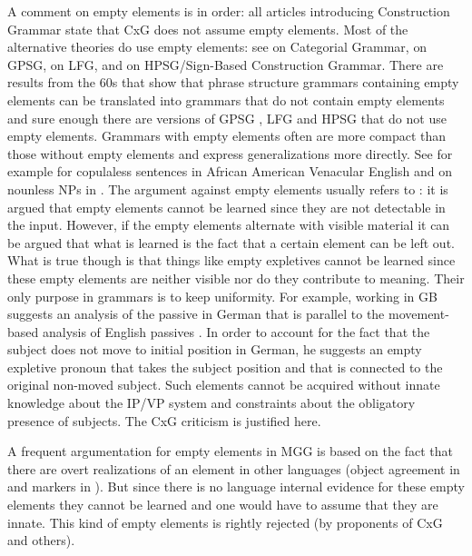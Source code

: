 \documentclass[output=paper]{langsci/langscibook}
\begin{document}
A comment on empty elements is in order: all articles introducing Construction Grammar state that
CxG does not assume empty elements. Most of the alternative theories do use empty elements: see
\citet{KoenigE99a-u} on Categorial Grammar, \citet*[]{GKPS85a} on GPSG, \citet[]{Bresnan2001a} on LFG,  and  on HPSG/Sign-Based
Construction Grammar. There are results from the 60s that show that phrase structure grammars
containing empty elements can be translated into grammars that do not contain empty elements
\citep*[, Lemma~4.1]{BHPS61a} and sure enough there are versions of GPSG \citep[--77]{Uszkoreit87a}, LFG \citep{KZ89a,DKK2001a-u} and HPSG \parencites{BMS2001a}[]{Sag2010b} that do not use empty elements. Grammars with empty elements often are more compact than
those without empty elements and express generalizations more directly. See for example
\citet{Bender2000a} for copulaless sentences in African American Venacular
English and \citet{Mueller2004e} on nounless NPs in
. The argument against empty elements usually refers to : it
is argued that empty elements cannot be learned since they are not detectable in the input. However,
if the empty elements alternate with visible material it can be argued that what is learned is the
fact that a certain element can be left out. What is true though is that things like empty
expletives cannot be learned since these empty elements are neither visible nor do they contribute to
meaning. Their only purpose in grammars is to keep uniformity. For example, \citet{Grewendorf93}
working in GB suggests an analysis of the passive in German that is parallel to the movement-based analysis of English
passives \citep[]{Chomsky81a}. In order to account for the fact that the subject does not move to
initial position in German, he suggests an empty expletive pronoun that takes the subject position and that is connected to the original
non-moved subject. Such elements cannot be acquired without innate knowledge about the IP/VP system and
constraints about the obligatory presence of subjects. The CxG criticism is justified here.

A frequent argumentation for empty elements in MGG is based on the fact that there are overt
realizations of an element in other languages (\eg object agreement in  and  markers in
). But since there is no language internal evidence for these empty elements they cannot be
learned and one would have to assume that they are innate. This kind of empty elements is rightly
rejected (by proponents of CxG and others).
\end{document}
